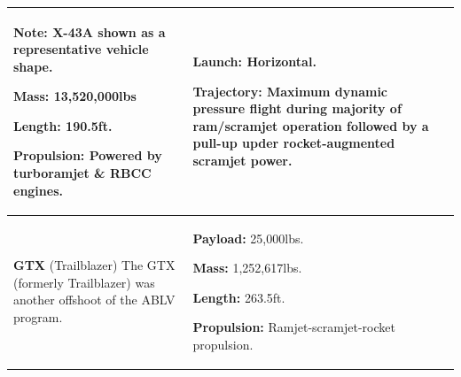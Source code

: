 {\begin{landscape}
\begin{xltabular}{\linewidth}{|X|X|X|}
			\textbf{Note:} X-43A shown as a representative vehicle shape.
			
			\textbf{Mass:} 13,520,000lbs
			
			\textbf{Length:} 190.5ft.
			
			\textbf{Propulsion:} Powered by turboramjet \& RBCC engines.
			
			&
			\small
			
			\textbf{Launch:} Horizontal. 
			
			\textbf{Trajectory:} Maximum dynamic pressure flight during majority of ram/scramjet operation followed by a pull-up upder rocket-augmented scramjet power. 
			\\ 
			\hline\small \textbf{GTX} (Trailblazer)\cite{Roche2000,Trefny1999} 
			\newline \newline 
			The GTX (formerly Trailblazer) was another offshoot of the ABLV program.
			&
			\small {} 
			
			\textbf{Payload:} 25,000lbs.
			
			\textbf{Mass:} 1,252,617lbs.
			
			\textbf{Length:} 263.5ft.
			
			
			\textbf{Propulsion:} Ramjet-scramjet-rocket propulsion. 
			

\end{xltabular}
\end{landscape}}
